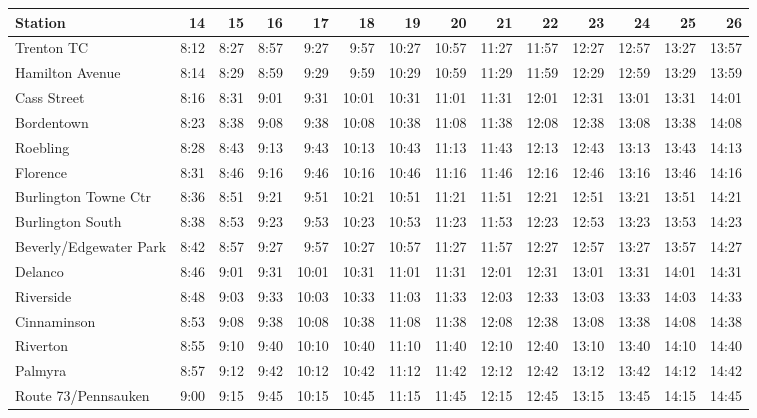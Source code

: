 \begin{center}\footnotesize\setlength{\tabcolsep}{3pt}\begin{tabular}{@{}lrrrrrrrrrrrrr@{}}\toprule
Station & 14 & 15 & 16 & 17 & 18 & 19 & 20 & 21 & 22 & 23 & 24 & 25 & 26 \\\midrule
Trenton TC & 8:12 & 8:27 & 8:57 & 9:27 & 9:57 & 10:27 & 10:57 & 11:27 & 11:57 & 12:27 & 12:57 & 13:27 & 13:57 \\
Hamilton Avenue & 8:14 & 8:29 & 8:59 & 9:29 & 9:59 & 10:29 & 10:59 & 11:29 & 11:59 & 12:29 & 12:59 & 13:29 & 13:59 \\
Cass Street & 8:16 & 8:31 & 9:01 & 9:31 & 10:01 & 10:31 & 11:01 & 11:31 & 12:01 & 12:31 & 13:01 & 13:31 & 14:01 \\
Bordentown & 8:23 & 8:38 & 9:08 & 9:38 & 10:08 & 10:38 & 11:08 & 11:38 & 12:08 & 12:38 & 13:08 & 13:38 & 14:08 \\
Roebling & 8:28 & 8:43 & 9:13 & 9:43 & 10:13 & 10:43 & 11:13 & 11:43 & 12:13 & 12:43 & 13:13 & 13:43 & 14:13 \\
Florence & 8:31 & 8:46 & 9:16 & 9:46 & 10:16 & 10:46 & 11:16 & 11:46 & 12:16 & 12:46 & 13:16 & 13:46 & 14:16 \\
Burlington Towne Ctr & 8:36 & 8:51 & 9:21 & 9:51 & 10:21 & 10:51 & 11:21 & 11:51 & 12:21 & 12:51 & 13:21 & 13:51 & 14:21 \\
Burlington South & 8:38 & 8:53 & 9:23 & 9:53 & 10:23 & 10:53 & 11:23 & 11:53 & 12:23 & 12:53 & 13:23 & 13:53 & 14:23 \\
Beverly/Edgewater Park & 8:42 & 8:57 & 9:27 & 9:57 & 10:27 & 10:57 & 11:27 & 11:57 & 12:27 & 12:57 & 13:27 & 13:57 & 14:27 \\
Delanco & 8:46 & 9:01 & 9:31 & 10:01 & 10:31 & 11:01 & 11:31 & 12:01 & 12:31 & 13:01 & 13:31 & 14:01 & 14:31 \\
Riverside & 8:48 & 9:03 & 9:33 & 10:03 & 10:33 & 11:03 & 11:33 & 12:03 & 12:33 & 13:03 & 13:33 & 14:03 & 14:33 \\
Cinnaminson & 8:53 & 9:08 & 9:38 & 10:08 & 10:38 & 11:08 & 11:38 & 12:08 & 12:38 & 13:08 & 13:38 & 14:08 & 14:38 \\
Riverton & 8:55 & 9:10 & 9:40 & 10:10 & 10:40 & 11:10 & 11:40 & 12:10 & 12:40 & 13:10 & 13:40 & 14:10 & 14:40 \\
Palmyra & 8:57 & 9:12 & 9:42 & 10:12 & 10:42 & 11:12 & 11:42 & 12:12 & 12:42 & 13:12 & 13:42 & 14:12 & 14:42 \\
Route 73/Pennsauken & 9:00 & 9:15 & 9:45 & 10:15 & 10:45 & 11:15 & 11:45 & 12:15 & 12:45 & 13:15 & 13:45 & 14:15 & 14:45 \\

\end{tabular}
\end{center}
